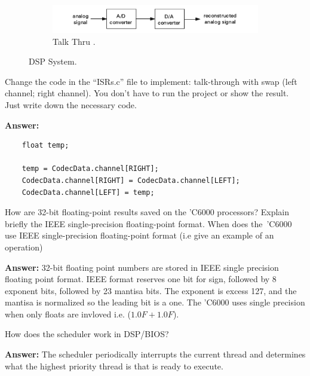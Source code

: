 \documentclass{article}
\begin{document}
\begin{enumerate}
\begin{item}
\begin{figure}[H]
\begin{center}
      \begin{subfigure}[b]{0.5\linewidth}
        \includegraphics[width=\linewidth]{img/talk_thru.png}
        \caption{Talk Thru \cite{Welch:2011}.}
      \end{subfigure}

      \caption{DSP System.}
    \end{center}
  \end{figure}
  \end{item}

  \begin{item}
    Change the code in the “ISRs.c” file to implement: talk-through with swap (left channel; right channel). You don’t have to run the project or show the result. Just write down the necessary code.

  \textbf{Answer:}
    \begin{verbatim}
    float temp;

    temp = CodecData.channel[RIGHT];
    CodecData.channel[RIGHT] = CodecData.channel[LEFT];
    CodecData.channel[LEFT] = temp;
    \end{verbatim}
  \end{item}

  \begin{item}
    How are 32-bit floating-point results saved on the 'C6000 processors? Explain briefly the IEEE single-precision floating-point format. When does the 'C6000 use IEEE single-precision floating-point format (i.e give an example of an operation)

  \textbf{Answer:}
    32-bit floating point numbers are stored in IEEE single precision floating point format.
    IEEE format reserves one bit for sign, followed by 8 exponent bits, followed by 23 mantisa bits.
    The exponent is excess 127, and the mantisa is normalized so the leading bit is a one.
    The 'C6000 uses single precision when only floats are invloved i.e. ($1.0F + 1.0F$).
  \end{item}

  \begin{item}
    How does the scheduler work in DSP/BIOS?

  \textbf{Answer:}
    The scheduler periodically interrupts the current thread and determines what the highest priority thread is that is ready to execute.
  \end{item}


\end{enumerate}
\end{document}
